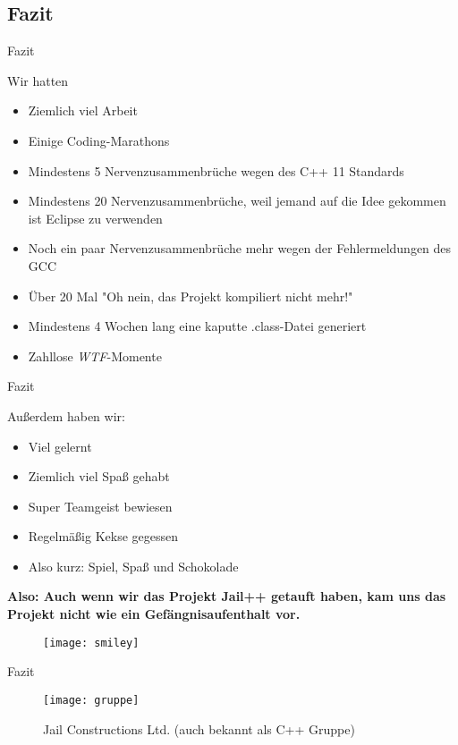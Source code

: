 \subsection{Fazit}

\begin{frame}{Fazit}

	\pause
	Wir hatten
	\pause
	\begin{itemize}
		\item Ziemlich viel Arbeit
		\pause
		\item Einige Coding-Marathons
		\pause
		\item Mindestens 5 Nervenzusammenbr\"uche wegen des C++ 11 Standards
		\pause
		\item Mindestens 20 Nervenzusammenbr\"uche, weil jemand auf die Idee gekommen ist Eclipse zu verwenden
		\pause
		\item Noch ein paar Nervenzusammenbr\"uche mehr wegen der Fehlermeldungen des GCC
		\pause
		\item \"Uber 20 Mal "Oh nein, das Projekt kompiliert nicht mehr!"
		\pause
		\item Mindestens 4 Wochen lang eine kaputte .class-Datei generiert
		\pause
		\item Zahllose \textit{WTF}-Momente
	\end{itemize}

\end{frame}

\begin{frame}{Fazit}

	\pause
	Außerdem haben wir:
	\pause
	\begin{itemize}
		\item Viel gelernt
		\pause
		\item Ziemlich viel Spaß gehabt
		\pause
		\item Super Teamgeist bewiesen
		\pause
		\item Regelm\"aßig Kekse gegessen
		\pause
		\item Also kurz: Spiel, Spaß und Schokolade
		\pause
	\end{itemize} \newline \newline \vspace{5mm}	\textbf{\textcolor{fu-green}{Also: Auch wenn wir das Projekt Jail++ getauft haben, kam uns das Projekt nicht wie ein Gef\"angnisaufenthalt vor.}}
	
	\begin{figure}
		  \begin{center}
		    \leavevmode
		      \texttt{[image: smiley]}
		  \end{center}
		\end{figure}
	
\end{frame}

\begin{frame}{Fazit}

	\begin{figure}
	  \begin{center}
	    \leavevmode
	      \texttt{[image: gruppe]}
	    \caption{Jail Constructions Ltd. (auch bekannt als C++ Gruppe)}
	  \end{center}
	\end{figure}

\end{frame}